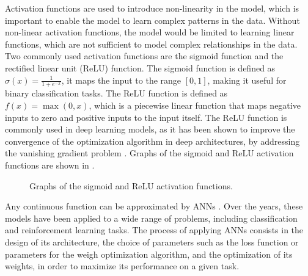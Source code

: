 Activation functions \cite{activation} are used to introduce non-linearity in the model, which is important to enable the model to learn complex patterns in the data. Without
non-linear activation functions, the model would be limited to learning linear functions, which are not sufficient to model complex relationships in the data.
Two commonly used activation functions are the sigmoid function and the rectified linear unit (ReLU) function. The sigmoid function is defined as
$\sigma(x) = \frac{1}{1 + e^{-x}}$, it maps the input to the range $[0, 1]$, making it useful for binary classification tasks. The ReLU function is defined as
$f(x) = \max(0, x)$, which is a piecewise linear function that maps negative inputs to zero and positive inputs to the input itself. The ReLU function is
commonly used in deep learning models, as it has been shown to improve the convergence of the optimization algorithm in deep architectures, by addressing the
vanishing gradient problem \cite{relu}. Graphs of the sigmoid and ReLU activation functions are shown in .

\begin{figure}
    \begin{center}
        \caption{Graphs of the sigmoid and ReLU activation functions.}
        \label{fig:activation_functions}
    \end{center}
\end{figure}

Any continuous function can be approximated by ANNs \cite{approximation}. Over the years, these models have been applied to a wide range of problems, including classification and reinforcement
learning tasks. The process of applying ANNs consists in the design of its architecture, the choice of parameters such as the loss function or parameters for the
weigh optimization algorithm, and the optimization of its weights, in order to maximize its performance on a given task.

